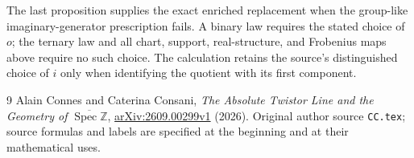 The last proposition supplies the exact enriched replacement when the
group-like imaginary-generator prescription fails.  A binary law
requires the stated choice of $o$; the ternary law and all chart,
support, real-structure, and Frobenius maps above require no such
choice.  The calculation retains the source's distinguished choice
of $i$ only when identifying the quotient with its first component.

\begin{thebibliography}{9}
Alain Connes and Caterina Consani,
\emph{The Absolute Twistor Line and the Geometry of
$\overline{\operatorname{Spec}\mathbb Z}$},
\href{https://arxiv.org/abs/2609.00299v1}{arXiv:2609.00299v1} (2026).
Original author source \nolinkurl{CC.tex}; source formulas and labels are
specified at the beginning and at their mathematical uses.
\end{thebibliography}
